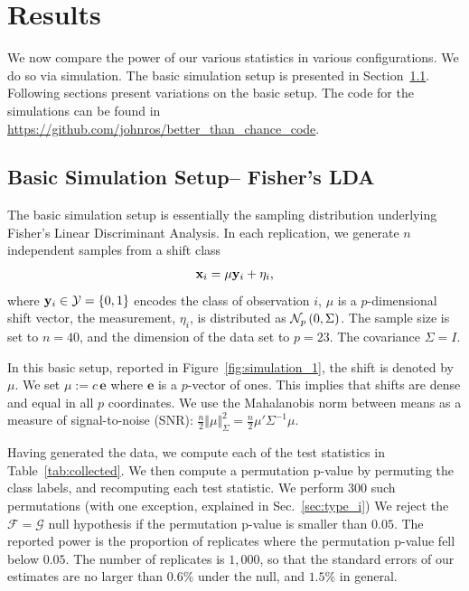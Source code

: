 \documentclass[oupdraft]{bio}
\begin{document}
\section{Results}
\label{sec:results}
We now compare the power of our various statistics in various configurations. 
We do so via simulation.
The basic simulation setup is presented in Section~\ref{sec:simulation_details}.
Following sections present variations on the basic setup.
The \R code for the simulations can be found in \url{https://github.com/johnros/better_than_chance_code}.


\subsection{Basic Simulation Setup-- Fisher's LDA}
\label{sec:simulation_details}

The basic simulation setup is essentially the sampling distribution underlying Fisher's Linear Discriminant Analysis. 
In each replication, we generate $n$ independent samples from a shift class 
\begin{align}
\label{eq:distribution}
\mathbf{x}_i = \mu \mathbf{y}_i + \eta_i,
\end{align}
where $\mathbf{y}_i \in \mathcal{Y}=\{ 0,1 \}$ encodes the class of observation $i$, $\mu$ is a $p$-dimensional shift vector, the measurement, $\eta_i$, is distributed as $\mathcal{N}_{p}\left(0,\Sigma\right)$.
The sample size is set to $n=40$, and the dimension of the data set to $p=23$. 
The covariance $\Sigma=I$. 

In this basic setup, reported in Figure~\ref{fig:simulation_1}, the shift is denoted by $\mu$. 
We set $\mu:=c \, \textbf{e}$ where $\textbf{e}$ is a $p$-vector of ones. 
This implies that shifts are dense and equal in all $p$ coordinates.
We use the Mahalanobis norm between means as a measure of signal-to-noise (SNR): 
$\frac{n}{2}\Vert \mu \Vert_\Sigma^2=\frac{n}{2} \mu' \Sigma^{-1} \mu$.

Having generated the data, we compute each of the test statistics in Table~\ref{tab:collected}.
We then compute a permutation p-value by permuting the class labels, and recomputing each test statistic. 
We perform $300$ such permutations (with one exception, explained in Sec.~\ref{sec:type_i})
We reject the $\mathcal{F}=\mathcal{G}$ null hypothesis if the permutation p-value is smaller than $0.05$.
The reported power is the proportion of replicates where the permutation p-value fell below $0.05$.
The number of replicates is $1,000$, so that the standard errors of our estimates are no larger than $0.6\%$ under the null, and $1.5\%$ in general. 
\end{document}
